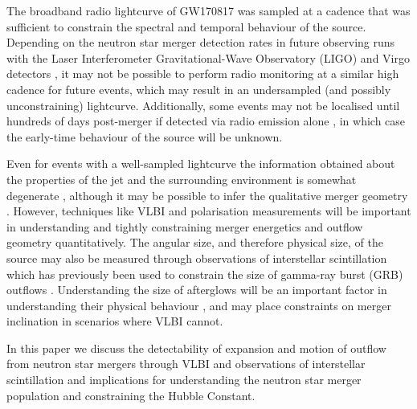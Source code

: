 The broadband radio lightcurve of GW170817 was sampled at a cadence that was sufficient to constrain the spectral and temporal behaviour of the source. Depending on the neutron star merger detection rates in future observing runs with the Laser Interferometer Gravitational-Wave Observatory (LIGO) and Virgo detectors \citep{2018LRR....21....3A}, it may not be possible to perform radio monitoring at a similar high cadence for future events, which may result in an undersampled (and possibly unconstraining) lightcurve. Additionally, some events may not be localised until hundreds of days post-merger if detected via radio emission alone \citep{2019PASA...36...19D}, in which case the early-time behaviour of the source will be unknown.

Even for events with a well-sampled lightcurve the information obtained about the properties of the jet and the surrounding environment is somewhat degenerate \citep{2018MNRAS.478..407N}, although it may be possible to infer the qualitative merger geometry \citep[e.g.][]{2018MNRAS.478L..18T,2018MNRAS.481.2581L}. However, techniques like VLBI and polarisation measurements will be important in understanding and tightly constraining merger energetics and outflow geometry quantitatively. The angular size, and therefore physical size, of the source may also be measured through observations of interstellar scintillation \citep{1997NewA....2..449G} which has previously been used  to constrain the size of gamma-ray burst (GRB) outflows \citep[e.g.][]{1997Natur.389..261F,2008ApJ...683..924C}. Understanding the size of afterglows will be an important factor in understanding their physical behaviour \citep[e.g.][]{2018MNRAS.481.2711G,2018PhRvL.120x1103L,2018MNRAS.478..407N}, and may place constraints on merger inclination in scenarios where VLBI cannot.

In this paper we discuss the detectability of expansion and motion of outflow from neutron star mergers through VLBI and observations of interstellar scintillation and implications for understanding the neutron star merger population and constraining the Hubble Constant.



